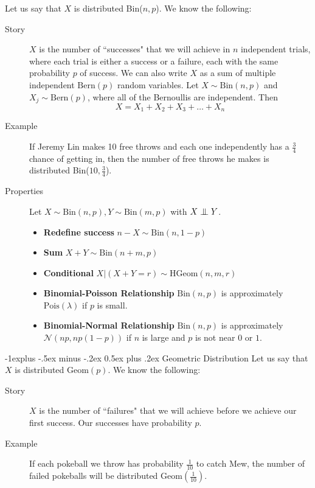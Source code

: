\documentclass[10pt,landscape]{article}
\makeatletter
\newcommand\independent{\protect\mathpalette{\protect\independenT}{\perp}}
\def\independenT#1#2{\mathrel{\setbox0\hbox{$#1#2$}%
    \copy0\kern-\wd0\mkern4mu\box0}}
\newcommand{\N}{\mathcal{N}}
\newcommand{\Bern}{\textrm{Bern}}
\newcommand{\Bin}{\textrm{Bin}}
\newcommand{\Pois}{\textrm{Pois}}
\newcommand{\Geom}{\textrm{Geom}}
\newcommand{\HGeom}{\textrm{HGeom}}
\renewcommand{\subsection}{\@startsection{subsection}{2}{0mm}%
                                {-1explus -.5ex minus -.2ex}%
                                {0.5ex plus .2ex}%
                                {\normalfont\normalsize\bfseries}}
\makeatother
\begin{document}
\begin{multicols*}{3}
Let us say that $X$ is distributed \Bin($n,p$). We know the following:
\begin{description}
    \item[Story] $X$ is the number of ``successes" that we will achieve in $n$ independent trials, where each trial is either a success or a failure, each with the same probability $p$ of success. We can also write $X$ as a sum of multiple independent $\Bern(p)$ random variables. Let $X \sim \Bin(n, p)$ and $X_j \sim \Bern(p)$, where all of the Bernoullis are independent. Then
        \[X = X_1 + X_2 + X_3 + \dots + X_n\]
    \item[Example] If Jeremy Lin makes 10 free throws and each one independently has a $\frac{3}{4}$ chance of getting in, then the number of free throws he makes is distributed  \Bin($10,\frac{3}{4}$).
\item[Properties] Let $X \sim \Bin(n,p), Y \sim \Bin(m,p)$ with $X \independent Y$.
\begin{itemize}
\item \textbf{Redefine success} $n-X \sim \Bin(n,1-p)$
\item \textbf{Sum} $X+Y \sim \Bin(n+m,p)$
\item \textbf{Conditional} $X|(X+Y=r) \sim \HGeom(n,m,r)$
 \item \textbf{Binomial-Poisson Relationship} $\Bin(n, p)$ is approximately  $\Pois(\lambda)$ if $p$ is small.
   \item \textbf{Binomial-Normal Relationship} $\Bin(n, p)$ is approximately $\N(np,np(1-p))$ if $n$ is large and $p$ is not near $0$ or $1$.
  \end{itemize}
\end{description}

\subsection{Geometric Distribution} Let us say that $X$ is distributed $\Geom(p)$. We know the following:
\begin{description}
    \item[Story] $X$ is the number of ``failures" that we will achieve before we achieve our first success. Our successes have probability $p$.
    \item[Example] If each pokeball we throw has probability  $\frac{1}{10}$ to catch Mew, the number of failed pokeballs will be distributed $\Geom(\frac{1}{10})$.
\end{description}


\end{multicols*}
\end{document}
